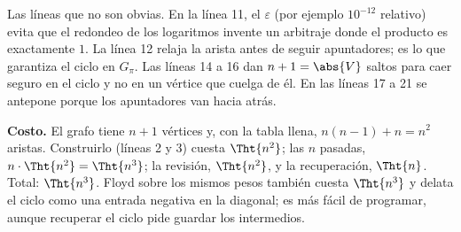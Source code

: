 \documentclass[11pt,letterpaper]{article}
\begin{document}
Las líneas que no son obvias. En la línea 11, el $\varepsilon$ (por
ejemplo $10^{-12}$ relativo) evita que el redondeo de los logaritmos
invente un arbitraje donde el producto es exactamente $1$. La línea 12
relaja la arista antes de seguir apuntadores; es lo que garantiza el
ciclo en $G_\pi$. Las líneas 14 a 16 dan $n + 1 = \abs{V}$ saltos para
caer seguro en el ciclo y no en un vértice que cuelga de él. En las
líneas 17 a 21 se antepone porque los apuntadores van hacia atrás.

\textbf{Costo.} El grafo tiene $n + 1$ vértices y, con la tabla
llena, $n(n - 1) + n = n^2$ aristas. Construirlo (líneas 2 y 3) cuesta
$\Tht{n^2}$;
las $n$ pasadas, $n \cdot \Tht{n^2} = \Tht{n^3}$; la revisión,
$\Tht{n^2}$, y la recuperación, $\Tht{n}$. Total: $\Tht{n^3}$. Floyd
sobre los mismos pesos también cuesta $\Tht{n^3}$ y delata el ciclo
como una entrada negativa en la diagonal; es más fácil de programar,
aunque recuperar el ciclo pide guardar los intermedios.
\end{document}
